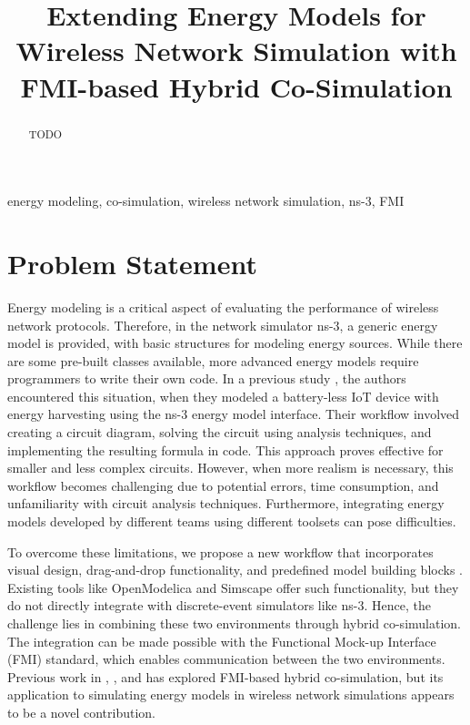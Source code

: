 \documentclass[conference]{IEEEtran}
\def\ns3{ns-3}
\begin{document}
\title{Extending Energy Models for Wireless Network Simulation with FMI-based Hybrid Co-Simulation}

\author{
}

\maketitle

\begin{abstract}
TODO
\end{abstract}

\begin{IEEEkeywords}
energy modeling, co-simulation, wireless network simulation, \ns3, FMI
\end{IEEEkeywords}

\section{Problem Statement}

Energy modeling is a critical aspect of evaluating the performance of wireless network protocols.
Therefore, in the network simulator \ns3, a generic energy model \cite{wu2012energy}
is provided, with basic structures for modeling energy sources.
While there are some pre-built classes available, more advanced energy models require programmers to write their own code.
In a previous study \cite{capuzzo2021ns}, the authors encountered this situation, when they modeled a battery-less IoT device with energy harvesting using the \ns3 energy model interface.
Their workflow involved creating a circuit diagram, solving the circuit using analysis techniques, and implementing the resulting formula in code. 
This approach proves effective for smaller and less complex circuits.
However, when more realism is necessary, this workflow becomes challenging due to potential errors, time consumption, and unfamiliarity with circuit analysis techniques. Furthermore, integrating energy models developed by different teams using different toolsets can pose difficulties.

To overcome these limitations, we propose a new workflow that incorporates visual design, drag-and-drop functionality, and predefined model building blocks \cite{carreira2020foundations}. Existing tools like OpenModelica and Simscape offer such functionality, but they do not directly integrate with discrete-event simulators like \ns3. Hence, the challenge lies in combining these two environments through hybrid co-simulation.
The integration can be made possible with the Functional Mock-up Interface (FMI) standard, which enables communication between the two environments.
Previous work in \cite{cremona2019hybrid}, \cite{cremona2016step}, and \cite{tavella2016toward} has explored FMI-based hybrid co-simulation, but its application to simulating energy models in wireless network simulations appears to be a novel contribution.
\end{document}
